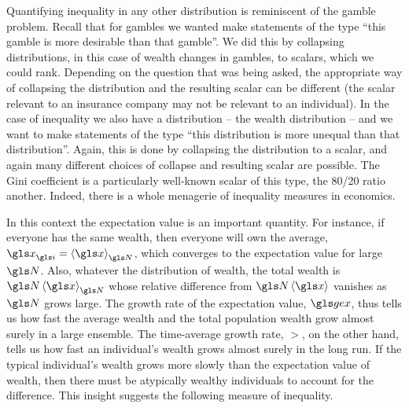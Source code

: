 Quantifying inequality in any other distribution is reminiscent of the gamble 
problem. Recall that for gambles we wanted make statements of the type ``this gamble 
is more desirable than that gamble''. We did this by collapsing distributions, in this case of wealth changes in gambles, to scalars, which we could rank.
Depending on the question that was being asked, the appropriate way of collapsing the distribution and the resulting scalar can be different (the scalar relevant to an insurance company may not be relevant to an individual).
In the case of inequality we also have a distribution -- the wealth distribution -- and we 
want to make statements of the type ``this distribution is more unequal than that 
distribution''. Again, this is done by collapsing the distribution to a scalar, and again 
many different choices of collapse and resulting scalar are possible. The Gini 
coefficient is a particularly well-known scalar of this type, the 80/20 ratio another. Indeed, there is a whole menagerie of inequality measures in economics.

In this context the expectation value is an important quantity. 
For instance, if everyone has the same wealth, then everyone will own the average, $\x_\gi=\ave{\x}_\N$, which converges to the expectation value for large $\N$. Also, whatever the distribution 
of wealth, the total wealth is $\N\ave{\x}_\N$ whose relative difference from $\N\ave{\x}$ vanishes as $\N$ grows large. The growth 
rate of the expectation value, $\gex$, thus tells us how fast the average wealth and the 
total population wealth grow almost surely in a large ensemble. The time-average growth rate, $\gt$, on the other hand, tells us how fast an individual's wealth grows almost surely in 
the long run. If the typical individual's wealth grows more slowly than the 
expectation value of wealth, then there must be atypically wealthy individuals 
to account for the difference. This insight suggests the following measure of 
inequality.


